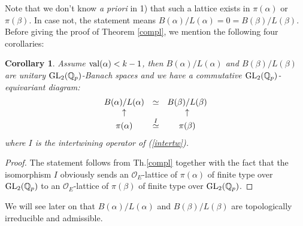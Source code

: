 \documentclass[11pt]{amsart}
\def\Q{{\mathbb Q}_p}
\def\G{{\rm GL}_2(\Q)}
\def\O{{\mathcal O}_E}
\newtheorem{cor}[definit]{\bf{Corollary}}
\begin{document}
Note that we don't know {\it a priori} in 1) that such a lattice
exists in $\pi(\alpha)$ or $\pi(\beta)$. In case not, the statement
means $B(\alpha)/L(\alpha)=0=B(\beta)/L(\beta)$. Before giving the
proof of Theorem \ref{compl}, we mention the following four
corollaries:  
  
\begin{cor}\label{1ercas} 
Assume ${\rm val}(\alpha)<k-1$, then $B(\alpha)/L(\alpha)$ and
$B(\beta)/L(\beta)$ are unitary $\G$-Banach spaces and we have a
commutative $\G$-equivariant diagram:  
$$\begin{matrix}B(\alpha)/L(\alpha)&\simeq &B(\beta)/L(\beta)\\
  \uparrow &&\uparrow \\ \pi(\alpha)& \buildrel I\over\simeq
  &\pi(\beta)\end{matrix}$$  
where $I$ is the intertwining operator of (\ref{intertw}). 
\end{cor} 
\begin{proof} 
The statement follows from Th.\ref{compl} together with the fact that
the isomorphism $I$ obviously sends an $\O$-lattice of $\pi(\alpha)$ of
finite type over $\G$ to an $\O$-lattice of $\pi(\beta)$ of finite
type over $\G$.  
\end{proof} 
 
We will see later on that $B(\alpha)/L(\alpha)$ and
$B(\beta)/L(\beta)$ are topologically irreducible and admissible.  
 
\end{document}
